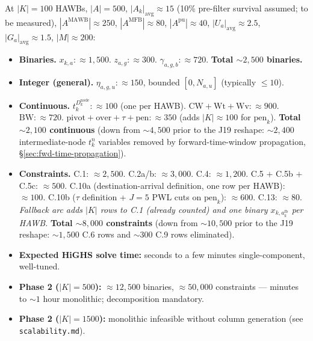 \documentclass[11pt,a4paper]{article}
\theoremstyle{definition}
\begin{document}
At $|K| = 100$ HAWBs, $|A| = 500$, $|A_k|_{\text{avg}} \approx 15$ (10\%
pre-filter survival assumed; to be measured),
$|A^{\text{MAWB}}| \approx 250$, $|A^{\text{MFB}}| \approx 80$,
$|A^{\text{pu}}| \approx 40$, $|U_a|_{\text{avg}} \approx 2.5$,
$|G_a|_{\text{avg}} \approx 1.5$, $|M| \approx 200$:

\begin{itemize}[noitemsep]
  \item \textbf{Binaries.} $x_{k,a}: \approx 1{,}500$.
        $z_{a,g}: \approx 300$.
        $\gamma_{a,g,b}: \approx 720$.
        \textbf{Total $\sim 2{,}500$ binaries.}
  \item \textbf{Integer (general).} $\eta_{a,g,u}: \approx 150$, bounded
        $[0, N_{a,u}]$ (typically $\leq 10$).
  \item \textbf{Continuous.} $t_k^{D_k^{\text{node}}}: \approx 100$ (one per
        HAWB). $\text{CW} + \text{Wt} + \text{Wv}: \approx 900$. $\text{BW}:
        \approx 720$. $\text{pivot} + \text{over} + \tau + \text{pen}: \approx
        350$ (adds $|K| \approx 100$ for $\text{pen}_k$).
        \textbf{Total $\sim 2{,}100$ continuous} (down from $\sim 4{,}500$
        prior to the J19 reshape: $\sim 2{,}400$ intermediate-node $t_k^n$
        variables removed by forward-time-window propagation,
        \S\ref{sec:fwd-time-propagation}).
  \item \textbf{Constraints.} C.1: $\approx 2{,}500$. C.2a/b: $\approx 3{,}000$.
        C.4: $\approx 1{,}200$. C.5 $+$ C.5b $+$ C.5c: $\approx 500$.
        C.10a (destination-arrival definition, one row per HAWB):
        $\approx 100$. C.10b ($\tau$ definition + $J = 5$ PWL cuts on
        $\text{pen}_k$): $\approx 600$. C.13: $\approx 80$. \emph{Fallback
        arc adds $|K|$ rows to C.1 (already counted) and one binary
        $x_{k, a^{\text{fb}}_k}$ per HAWB.}
        \textbf{Total $\sim 8{,}000$ constraints} (down from $\sim 10{,}500$
        prior to the J19 reshape: $\sim 1{,}500$ C.6 rows and $\sim 300$
        C.9 rows eliminated).
  \item \textbf{Expected HiGHS solve time:} seconds to a few minutes
        single-component, well-tuned.
  \item \textbf{Phase 2 ($|K| = 500$):} $\approx 12{,}500$ binaries, $\approx
        50{,}000$ constraints --- minutes to $\sim 1$ hour monolithic;
        decomposition mandatory.
  \item \textbf{Phase 2 ($|K| = 1500$):} monolithic infeasible without
        column generation (see \texttt{scalability.md}).
\end{itemize}
\end{document}
